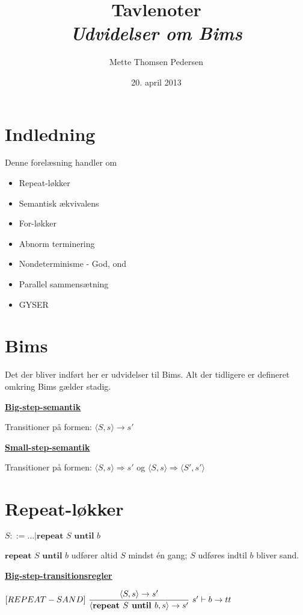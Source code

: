 \documentclass[a4paper,10pt,article]{memoir}
\title{Tavlenoter \\ \emph{Udvidelser om Bims}}
\author{Mette Thomsen Pedersen}
\date{20. april 2013}
\theoremstyle{definition}
\begin{document}
\maketitle

\tableofcontents*

\chapter{Indledning}

Denne forelæsning handler om

\begin{itemize}
\item Repeat-løkker
\item Semantisk ækvivalens
\item For-løkker
\item Abnorm terminering
\item Nondeterminisme - God, ond
\item Parallel sammensætning
\item GYSER
\end{itemize}

\chapter{Bims}
Det der bliver indført her er udvidelser til Bims. Alt der tidligere er defineret omkring Bims gælder stadig.

\underline{\textbf{Big-step-semantik}}

Transitioner på formen: $\langle S,s \rangle \rightarrow s'$

\underline{\textbf{Small-step-semantik}}

Transitioner på formen: $\langle S,s \rangle \Rightarrow s'$ og $\langle S,s \rangle \Rightarrow \langle S',s' \rangle$

\chapter{Repeat-løkker}
$S::= \dots | \textbf{repeat } S \textbf{ until }b$

\begin{definition}

$\textbf{repeat } S \textbf{ until } b$ udfører altid $S$ mindst én gang; $S$ udføres indtil $b$ bliver sand.
\end{definition}

\underline{\textbf{Big-step-transitionsregler}}

$[REPEAT-SAND] \text{   } \dfrac{\langle S,s \rangle \rightarrow s'}{\langle \textbf{repeat } S \textbf{ until } b,s \rangle \rightarrow s'} \text{   } s' \vdash b \rightarrow tt$
\end{document}
